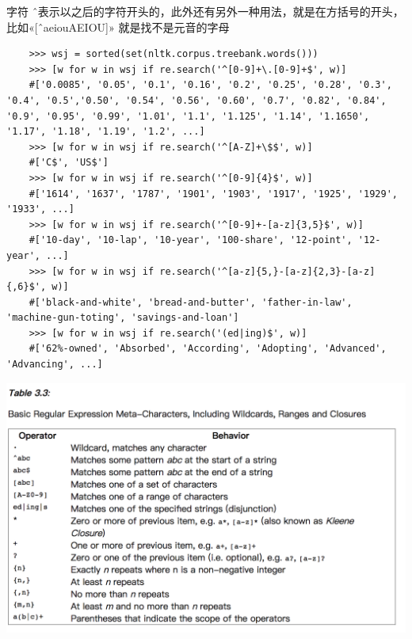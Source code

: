 \documentclass{ctexart}
\begin{document}
	字符 \^\ 表示以之后的字符开头的，此外还有另外一种用法，就是在方括号的开头，比如«[\^\ aeiouAEIOU]» 就是找不是元音的字母
	
	\begin{lstlisting}
	>>> wsj = sorted(set(nltk.corpus.treebank.words()))
	>>> [w for w in wsj if re.search('^[0-9]+\.[0-9]+$', w)]
	#['0.0085', '0.05', '0.1', '0.16', '0.2', '0.25', '0.28', '0.3', '0.4', '0.5','0.50', '0.54', '0.56', '0.60', '0.7', '0.82', '0.84', '0.9', '0.95', '0.99',	'1.01', '1.1', '1.125', '1.14', '1.1650', '1.17', '1.18', '1.19', '1.2', ...]
	>>> [w for w in wsj if re.search('^[A-Z]+\$$', w)]
	#['C$', 'US$']
	>>> [w for w in wsj if re.search('^[0-9]{4}$', w)]
	#['1614', '1637', '1787', '1901', '1903', '1917', '1925', '1929', '1933', ...]
	>>> [w for w in wsj if re.search('^[0-9]+-[a-z]{3,5}$', w)]
	#['10-day', '10-lap', '10-year', '100-share', '12-point', '12-year', ...]
	>>> [w for w in wsj if re.search('^[a-z]{5,}-[a-z]{2,3}-[a-z]{,6}$', w)]
	#['black-and-white', 'bread-and-butter', 'father-in-law', 'machine-gun-toting',	'savings-and-loan']
	>>> [w for w in wsj if re.search('(ed|ing)$', w)]
	#['62%-owned', 'Absorbed', 'According', 'Adopting', 'Advanced', 'Advancing', ...]
	\end{lstlisting}
	
	\includegraphics[width=0.8\linewidth]{pic/basic_reg_exp}
	
\end{document}
